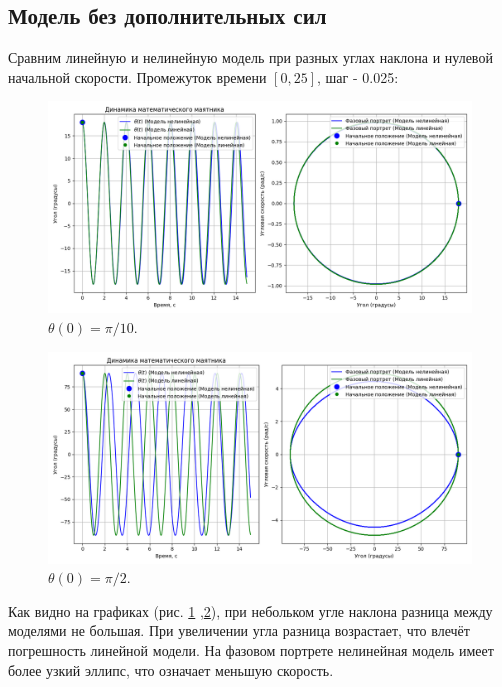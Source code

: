 \subsection*{Модель без дополнительных сил}
Сравним линейную и нелинейную модель при разных углах наклона и нулевой начальной скорости. Промежуток времени $[0,25]$, шаг - 0.025:
\begin{figure}[h]  %
	\centering
	\includegraphics[width=1\textwidth]{imgs/pi10.png}  %
	\caption{$\theta(0) = \pi / 10$.}  %
	\label{fig:pi10}  %
\end{figure}
\begin{figure}[h]  %
	\centering
	\includegraphics[width=1\textwidth]{imgs/pi2.png}  %
	\caption{$\theta(0) = \pi / 2$.}  %
	\label{fig:pi2}  %
\end{figure}

Как видно на графиках (рис. \ref{fig:pi10} ,\ref{fig:pi2}), при небольком угле наклона разница между моделями не большая. При увеличении угла разница возрастает, что влечёт погрешность линейной модели. На фазовом портрете нелинейная модель имеет более узкий эллипс, что означает меньшую скорость. 

